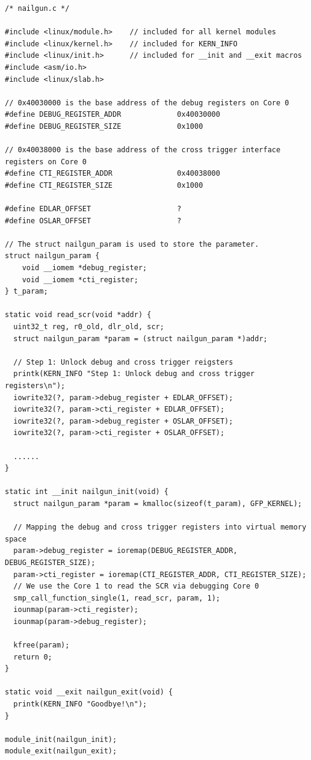 
\begin{lstlisting}
/* nailgun.c */

#include <linux/module.h>    // included for all kernel modules
#include <linux/kernel.h>    // included for KERN_INFO
#include <linux/init.h>      // included for __init and __exit macros
#include <asm/io.h>
#include <linux/slab.h>

// 0x40030000 is the base address of the debug registers on Core 0
#define DEBUG_REGISTER_ADDR             0x40030000
#define DEBUG_REGISTER_SIZE             0x1000

// 0x40038000 is the base address of the cross trigger interface registers on Core 0
#define CTI_REGISTER_ADDR               0x40038000
#define CTI_REGISTER_SIZE               0x1000

#define EDLAR_OFFSET                    ?
#define OSLAR_OFFSET                    ?

// The struct nailgun_param is used to store the parameter.
struct nailgun_param {
    void __iomem *debug_register;
    void __iomem *cti_register;
} t_param;

static void read_scr(void *addr) {
  uint32_t reg, r0_old, dlr_old, scr;
  struct nailgun_param *param = (struct nailgun_param *)addr;

  // Step 1: Unlock debug and cross trigger reigsters
  printk(KERN_INFO "Step 1: Unlock debug and cross trigger registers\n");
  iowrite32(?, param->debug_register + EDLAR_OFFSET);
  iowrite32(?, param->cti_register + EDLAR_OFFSET);
  iowrite32(?, param->debug_register + OSLAR_OFFSET);
  iowrite32(?, param->cti_register + OSLAR_OFFSET);

  ......
}

static int __init nailgun_init(void) {
  struct nailgun_param *param = kmalloc(sizeof(t_param), GFP_KERNEL);
  
  // Mapping the debug and cross trigger registers into virtual memory space 
  param->debug_register = ioremap(DEBUG_REGISTER_ADDR, DEBUG_REGISTER_SIZE);
  param->cti_register = ioremap(CTI_REGISTER_ADDR, CTI_REGISTER_SIZE);
  // We use the Core 1 to read the SCR via debugging Core 0
  smp_call_function_single(1, read_scr, param, 1);
  iounmap(param->cti_register);
  iounmap(param->debug_register);

  kfree(param);
  return 0;
}

static void __exit nailgun_exit(void) {
  printk(KERN_INFO "Goodbye!\n");
}

module_init(nailgun_init);
module_exit(nailgun_exit);

\end{lstlisting}

